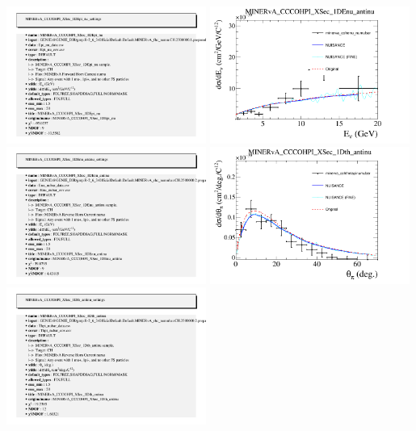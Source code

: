 \documentclass{article}
\begin{document}
\includegraphics[width=0.49\textwidth]{figures/minerva_cohtpinumu_info.png}
\centering
\includegraphics[width=0.49\textwidth]{figures/minerva_cohenu_numubar_comp.png}
\includegraphics[width=0.49\textwidth]{figures/minerva_cohenu_numubar_info.png}
\centering
\includegraphics[width=0.49\textwidth]{figures/minerva_cohthetapinumubar_comp.png}
\includegraphics[width=0.49\textwidth]{figures/minerva_cohthetapinumubar_info.png}
\end{document}
